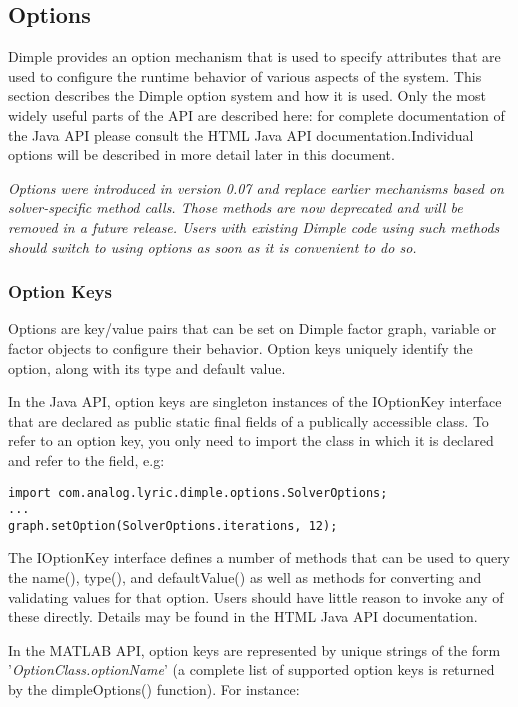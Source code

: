 \subsection{Options}
\label{sec:Options}

Dimple provides an option mechanism that is used to specify attributes that are used to configure the runtime behavior of various aspects of the system. This section describes the Dimple option system and how it is used. \ifjava Only the most widely useful parts of the API are described here: for complete documentation of the Java API please consult the HTML Java API documentation.\fi Individual options will be described in more detail later in this document.

\textit{Options were introduced in version 0.07 and replace earlier mechanisms based on solver-specific method calls. Those methods are now deprecated and will be removed in a future release. Users with existing Dimple code using such methods should switch to using options as soon as it is convenient to do so.}

\subsubsection{Option Keys}

Options are key/value pairs that can be set on Dimple factor graph, variable or factor objects to configure their behavior. Option keys uniquely identify the option, along with its type and default value. 

\ifjava 
In the Java API, option keys are singleton instances of the IOptionKey interface that are declared as public static final fields of a publically accessible class. To refer to an option key, you only need to import the class in which it is declared and refer to the field, e.g:

\begin{lstlisting}
import com.analog.lyric.dimple.options.SolverOptions;
...
graph.setOption(SolverOptions.iterations, 12);
\end{lstlisting}

The IOptionKey interface defines a number of methods that can be used to query the name(), type(), and defaultValue() as well as methods for converting and validating values for that option. Users should have little reason to invoke any of these directly. Details may be found in the HTML Java API documentation.

\fi

\ifmatlab
In the MATLAB API, option keys are represented by unique strings of the form '\textit{OptionClass.optionName}' (a complete list of supported option keys is returned by the dimpleOptions() function). For instance:

